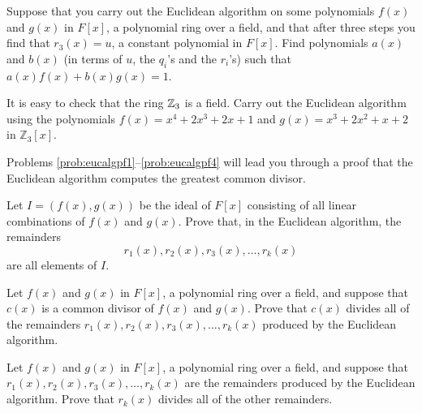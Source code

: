 \begin{problem}\label{prob:backsub1}
Suppose that you carry out the Euclidean algorithm on some polynomials \(f(x)\) and \(g(x)\) in \(F[x]\), a polynomial ring over a field, and that after three steps you find that \(r_3(x) = u\), a constant polynomial in \(F[x]\). Find polynomials \(a(x)\) and \(b(x)\) (in terms of \(u\), the \(q_i\)'s and the \(r_i\)'s) such that \(a(x)f(x)+b(x)g(x) = 1\).
\begin{annotation}
\end{annotation}
\end{problem}

\begin{problem}\label{prob:z3euclid}
It is easy to check that the ring $\mathbb{Z}_3$ is a field. Carry out the Euclidean algorithm using the polynomials \(f(x)=x^4+2x^3+2x+1\) and \(g(x) = x^3+2x^2+x+2\) in \(\mathbb{Z}_3[x]\).
\end{problem}

Problems \ref{prob:eucalgpf1}--\ref{prob:eucalgpf4} will lead you through a proof that the Euclidean algorithm computes the greatest common divisor.

\begin{problem}\label{prob:eucalgpf1}
Let \(I = (f(x),g(x))\) be the ideal of \(F[x]\) consisting of all linear combinations of \(f(x)\) and \(g(x)\). Prove that, in the Euclidean algorithm, the remainders
$$r_1(x), r_2(x), r_3(x), \ldots , r_k(x)$$
are all elements of \(I\).
\end{problem}

\begin{problem}
Let \(f(x)\) and \(g(x)\) in \(F[x]\), a polynomial ring over a field, and suppose that \(c(x)\) is a common divisor of \(f(x)\) and \(g(x)\). Prove that \(c(x)\) divides all of the remainders \(r_1(x), r_2(x), r_3(x), \ldots , r_k(x)\) produced by the Euclidean algorithm.
\end{problem}

\begin{problem}
Let \(f(x)\) and \(g(x)\) in \(F[x]\), a polynomial ring over a field, and suppose that \(r_1(x), r_2(x), r_3(x), \ldots , r_k(x)\)  are the remainders produced by the Euclidean algorithm. Prove that \(r_k(x)\) divides all of the other remainders.
\end{problem}

